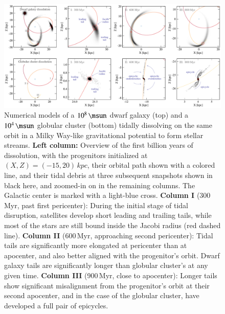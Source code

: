 \documentclass[final,5p,times,twocolumn,authoryear]{elsarticle}
\begin{document}
\begin{figure}[t!]
\begin{center}
\includegraphics[width=1\textwidth]{figures/stream_formation.pdf}
\end{center}
\caption{%
Numerical models of a $10^8\,\unit{\msun}$ dwarf galaxy (top) and a $10^4\,\unit{\msun}$ globular cluster (bottom) tidally dissolving on the same orbit in a Milky Way-like gravitational potential to form stellar streams.
\textbf{Left column:} Overview of the first billion years of dissolution, with the progenitors initialized at $(X,Z)=(-15,20)\,\unit{kpc}$, their orbital path shown with a colored line, and their tidal debris at three subsequent snapshots shown in black here, and zoomed-in on in the remaining columns.
The Galactic center is marked with a light-blue cross.
\textbf{Column I} (300\,\unit{Myr}, past first pericenter): During the initial stage of tidal disruption, satellites develop short leading and trailing tails, while most of the stars are still bound inside the Jacobi radius (red dashed line).
\textbf{Column II} (600\,\unit{Myr}, approaching second pericenter): Tidal tails are significantly more elongated at pericenter than at apocenter, and also better aligned with the progenitor's orbit.
Dwarf galaxy tails are significantly longer than globular cluster's at any given time.
\textbf{Column III} (900\,\unit{Myr}, close to apocenter): Longer tails show significant misalignment from the progenitor's orbit at their second apocenter, and in the case of the globular cluster, have developed a full pair of epicycles.
}
\label{fig:stream_formation}
\end{figure}
\end{document}
